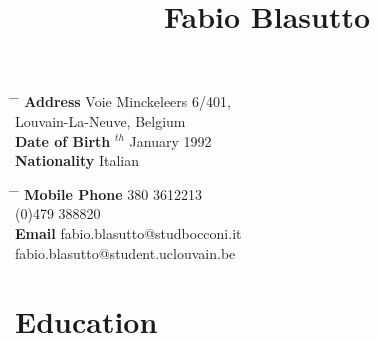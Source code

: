 \documentclass[10pt]{article} %
\begin{document}

\title{Fabio Blasutto} %


\pagestyle{empty}
\parbox{0.5\textwidth}{ %
\begin{tabbing} %
\hspace{3cm} \= \hspace{4cm} \= \kill %
{\bf Address} \> Voie Minckeleers 6/401,\\ %
\>Louvain-La-Neuve, Belgium\\ %
{\bf Date of Birth} $^{th}$ January 1992 \\ %
{\bf Nationality} \> Italian %
\end{tabbing}}
\hfill %
\parbox{0.5\textwidth}{ %
\begin{tabbing} %
\hspace{3cm} \= \hspace{4cm} \= \kill %
{\bf Mobile Phone}  380 3612213 \\  (0)479 388820 \\ %
{\bf Email} \> fabio.blasutto@studbocconi.it \\
\> fabio.blasutto@student.uclouvain.be %
\end{tabbing}}


\section{Education}

\end{document}
